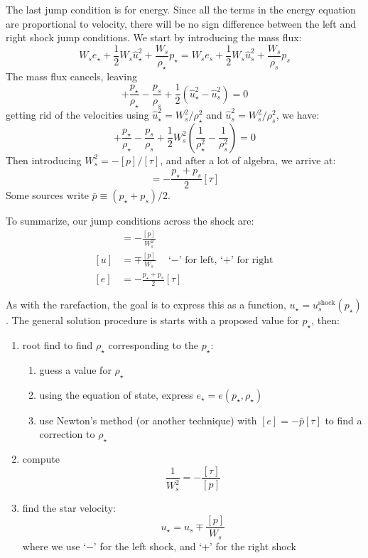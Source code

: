 The last jump condition is for energy.  Since all the terms in the 
energy equation are proportional to velocity, there will be no sign
difference between the left and right shock jump conditions.  
We start by introducing the mass flux:
\begin{equation}
W_s e_\star + \frac{1}{2} W_s \hat{u}_\star^2 + \frac{W_s}{\rho_\star} p_\star =
  W_s e_s + \frac{1}{2} W_s \hat{u}_s^2 + \frac{W_s}{\rho_s} p_s
\end{equation}
The mass flux cancels, leaving
\begin{equation}
[e] + \frac{p_\star}{\rho_\star} - \frac{p_s}{\rho_s} + \frac{1}{2} \left ( \hat{u}_\star^2 - \hat{u}_s^2 \right ) = 0
\end{equation}
getting rid of the velocities using $\hat{u}_\star^2 = W_s^2/\rho_\star^2$ and 
$\hat{u}_s^2 = W_s^2/\rho_s^2$, we have:
\begin{equation}
[e] + \frac{p_\star}{\rho_\star} - \frac{p_s}{\rho_s} + \frac{1}{2} W_s^2 \left ( \frac{1}{\rho_\star^2} - \frac{1}{\rho_s^2} \right ) = 0
\end{equation}
Then introducing $W_s^2 = -[p]/[\tau]$, and after a lot of algebra, we arrive at:
\begin{equation}
[e] = -\frac{p_\star + p_s}{2} [\tau]
\end{equation}
Some sources write $\bar{p} \equiv (p_\star + p_s)/2$.

To summarize, our jump conditions across the shock are:
\begin{align}
[\tau] &= -\frac{[p]}{W_s^2} \\
[u] &= \mp \frac{[p]}{W_s} \quad\mbox{`$-$' for left, `+' for right}\\
[e] &= - \frac{p_\star + p_s}{2} [\tau] \label{eq:euler:shock:ejump}
\end{align}

As with the rarefaction, the goal is to express this as a function, $u_\star
= u_s^\mathrm{shock}(p_\star)$.  The general solution procedure is starts with
a proposed value for $p_\star$, then:
\begin{enumerate}
\item root find to find $\rho_\star$ corresponding to the $p_\star$:
  \begin{enumerate}
  \item guess a value for $\rho_\star$
  \item using the equation of state, express $e_\star = e(p_\star, \rho_\star)$
  \item use Newton's method (or another technique) with $[e] = -\bar{p} [\tau]$
     to find a correction to $\rho_\star$
  \end{enumerate}
\item compute 
  \begin{equation}
    \frac{1}{W_s^2} = - \frac{[\tau]}{[p]}
  \end{equation}
\item find the star velocity:
  \begin{equation}
    u_\star = u_s \mp \frac{[p]}{W_s}
  \end{equation}
  where we use `$-$' for the left shock, and `+' for the right shock
\end{enumerate}

